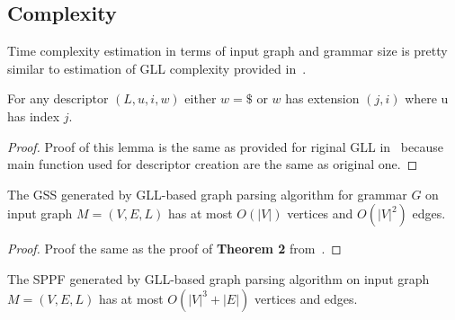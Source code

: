 \subsection{Complexity}

Time complexity estimation in terms of input graph and grammar size is pretty similar to estimation of GLL complexity provided in~\cite{gllParsingTree}.

\begin{lemma}\label{lem:Descriptors}
For any descriptor $(L,u,i,w)$ either $w = \$$ or $w$ has extension $(j,i)$ where u has index $j$.
\end{lemma}
\begin{proof}
Proof of this lemma is the same as provided for riginal GLL in~\cite{gllParsingTree} because main function used for descriptor creation are the same as original one.
\end{proof}


\begin{mytheorem}\label{thm:GSSSpace}
The GSS generated by GLL-based graph parsing algorithm for grammar $G$ on input graph $M=(V,E,L)$ has at most $O(|V|)$ vertices and $O(|V|^2)$ edges.
\end{mytheorem}

\begin{proof}

Proof the same as the proof of \textbf{Theorem 2} from~\cite{gllParsingTree}. 

\end{proof}

\begin{mytheorem}\label{thm:SPPFSpace}
The SPPF generated by GLL-based graph parsing algorithm on input graph $M=(V,E,L)$ has at most $O(|V|^3 + |E|)$ vertices and edges.
\end{mytheorem}

